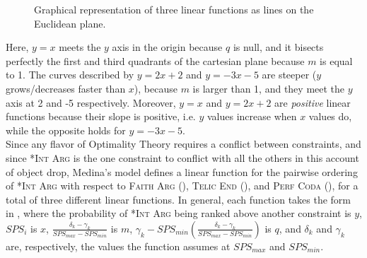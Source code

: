 \begin{figure}[htb]
\caption{Graphical representation of three linear functions as lines on the Euclidean plane.}
\end{figure}

Here, $y = x$ meets the $y$ axis in the origin because $q$ is null, and it bisects perfectly the first and third quadrants of the cartesian plane because $m$ is equal to 1. The curves described by $y = 2x + 2$ and $y = -3x - 5$ are steeper ($y$ grows/decreases faster than $x$), because $m$ is larger than 1, and they meet the $y$ axis at 2 and -5 respectively. Moreover, $y = x$ and $y = 2x + 2$ are \textit{positive} linear functions because their slope is positive, i.e. $y$ values increase when $x$ values do, while the opposite holds for $y = -3x - 5$.\\
Since any flavor of Optimality Theory requires a conflict between constraints, and since \textsc{*Int Arg} is the one constraint to conflict with all the others in this account of object drop, Medina's model defines a linear function for the pairwise ordering of \textsc{*Int Arg} with respect to \textsc{Faith Arg} (), \textsc{Telic End} (), and \textsc{Perf Coda} (), for a total of three different linear functions. In general, each function takes the form in , where the probability of \textsc{*Int Arg} being ranked above another constraint is $y$, $SPS_i$ is $x$, $\frac{\delta_k - \gamma_k}{SPS_{max} - SPS_{min}}$ is $m$, $\gamma_k - SPS_{min} (\frac{\delta_k - \gamma_k}{SPS_{max} - SPS_{min}})$ is $q$, and $\delta_k$ and $\gamma_k$ are, respectively, the values the function assumes at $SPS_{max}$ and $SPS_{min}$.

